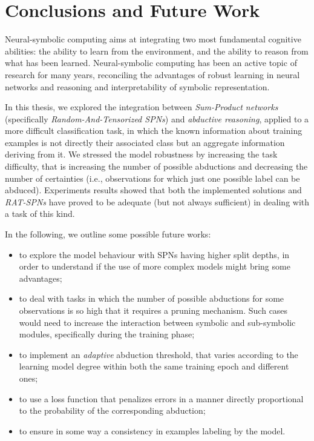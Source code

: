 \chapter{Conclusions and Future Work}
\label{ChapterConclusions} 
Neural-symbolic computing aims at integrating two most fundamental cognitive abilities: the ability to learn from the environment, and the ability to reason from what has been learned. Neural-symbolic computing has been an active topic of research for many years, reconciling the advantages of robust learning in neural networks and reasoning and interpretability of symbolic representation.

In this thesis, we explored the integration between \textit{Sum-Product networks} (specifically \textit{Random-And-Tensorized SPNs}) and \textit{abductive reasoning}, applied to a more difficult classification task, in which the known information about training examples is not directly their associated class but an aggregate information deriving from it. We stressed the model robustness by increasing the task difficulty, that is increasing the number of possible abductions and decreasing the number of certainties (i.e., observations for which just one possible label can be abduced). Experiments results showed that both the implemented solutions and \textit{RAT-SPNs} have proved to be adequate (but not always sufficient) in dealing with a task of this kind.

In the following, we outline some possible future works:

\begin{itemize}
	\item to explore the model behaviour with SPNs having higher split depths, in order to understand if the use of more complex models might bring some advantages;
	\item to deal with tasks in which the number of possible abductions for some observations is so high that it requires a pruning mechanism. Such cases would need to increase the interaction between symbolic and sub-symbolic modules, specifically during the training phase;
	\item to implement an \textit{adaptive} abduction threshold, that varies according to the learning model degree within both the same training epoch and different ones;
	\item to use a loss function that penalizes errors in a manner directly proportional to the probability of the corresponding abduction;
	\item to ensure in some way a consistency in examples labeling by the model.
\end{itemize}

